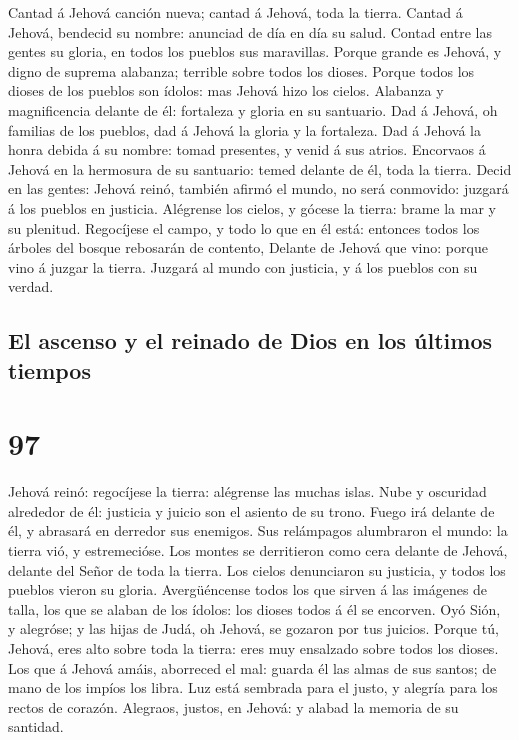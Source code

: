  Cantad á Jehová canción nueva; cantad á Jehová, toda la
tierra.  Cantad á Jehová, bendecid su nombre: anunciad de
día en día su salud.  Contad entre las gentes su gloria,
en todos los pueblos sus maravillas.  Porque grande es
Jehová, y digno de suprema alabanza; terrible sobre todos los dioses.
 Porque todos los dioses de los pueblos son ídolos: mas
Jehová hizo los cielos.  Alabanza y magnificencia delante
de él: fortaleza y gloria en su santuario.  Dad á Jehová,
oh familias de los pueblos, dad á Jehová la gloria y la fortaleza.
 Dad á Jehová la honra debida á su nombre: tomad
presentes, y venid á sus atrios.  Encorvaos á Jehová en la
hermosura de su santuario: temed delante de él, toda la tierra.
 Decid en las gentes: Jehová reinó, también afirmó el
mundo, no será conmovido: juzgará á los pueblos en justicia.
 Alégrense los cielos, y gócese la tierra: brame la mar y
su plenitud.  Regocíjese el campo, y todo lo que en él
está: entonces todos los árboles del bosque rebosarán de contento,
 Delante de Jehová que vino: porque vino á juzgar la
tierra. Juzgará al mundo con justicia, y á los pueblos con su verdad.

\hypertarget{el-ascenso-y-el-reinado-de-dios-en-los-uxfaltimos-tiempos}{%
\subsection{El ascenso y el reinado de Dios en los últimos
tiempos}\label{el-ascenso-y-el-reinado-de-dios-en-los-uxfaltimos-tiempos}}

\hypertarget{section-96}{%
\section{97}\label{section-96}}

 Jehová reinó: regocíjese la tierra: alégrense las muchas
islas.  Nube y oscuridad alrededor de él: justicia y
juicio son el asiento de su trono.  Fuego irá delante de
él, y abrasará en derredor sus enemigos.  Sus relámpagos
alumbraron el mundo: la tierra vió, y estremecióse.  Los
montes se derritieron como cera delante de Jehová, delante del Señor de
toda la tierra.  Los cielos denunciaron su justicia, y
todos los pueblos vieron su gloria.  Avergüéncense todos
los que sirven á las imágenes de talla, los que se alaban de los ídolos:
los dioses todos á él se encorven.  Oyó Sión, y alegróse;
y las hijas de Judá, oh Jehová, se gozaron por tus juicios.
 Porque tú, Jehová, eres alto sobre toda la tierra: eres
muy ensalzado sobre todos los dioses.  Los que á Jehová
amáis, aborreced el mal: guarda él las almas de sus santos; de mano de
los impíos los libra.  Luz está sembrada para el justo, y
alegría para los rectos de corazón.  Alegraos, justos, en
Jehová: y alabad la memoria de su santidad.


